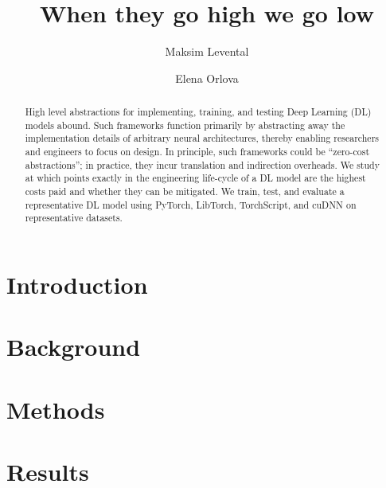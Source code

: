 \documentclass[sigconf]{acmart}
\begin{document}
\title{When they go high we go low}

\author{Maksim Levental}
\author{Elena Orlova}

\renewcommand{\shortauthors}{Levental and Orlova}

\begin{abstract}
  High level abstractions for implementing, training, and testing Deep Learning (DL) models abound.
  Such frameworks function primarily by abstracting away the implementation details of arbitrary neural architectures, thereby enabling researchers and engineers to focus on design.
  In principle, such frameworks could be ``zero-cost abstractions'';
  in practice, they incur translation and indirection overheads.
  We study at which points exactly in the engineering life-cycle of a DL model are the highest costs paid and whether they can be mitigated.
  We train, test, and evaluate a representative DL model using PyTorch, LibTorch, TorchScript, and cuDNN on representative datasets.
\end{abstract}

%

\maketitle

\section{Introduction}\label{sec:introduction}


\section{Background}\label{sec:background}


\section{Methods}\label{sec:methodology}


\section{Results}\label{sec:results}
\end{document}

